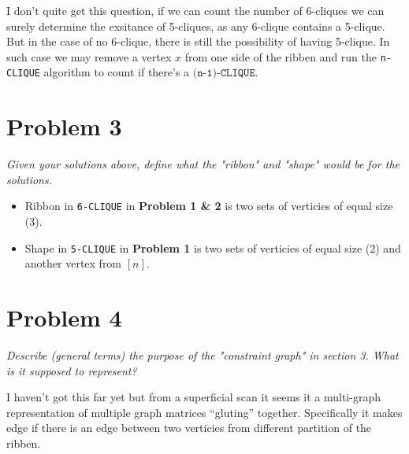 \documentclass[11pt]{article}
\newcommand{\ilc}{\texttt}
\begin{document}
\noindent I don't quite get this question, if we can count the number of 6-cliques we can surely determine the exsitance of 5-cliques, as any 6-clique contains a 5-clique. But in the case of no 6-clique, there is still the possibility of having 5-clique. In such case we may remove a vertex $x$ from one side of the ribben and run the \ilc{n-CLIQUE} algorithm to count if there's a $\ilc{(n-1)-CLIQUE}$.


\section*{Problem 3}
\textit{Given your solutions above, define what the "ribbon" and "shape" would be for the solutions.}\newline

\begin{itemize}
    \item Ribbon in \ilc{6-CLIQUE} in \textbf{Problem 1 & 2} is two sets of verticies of equal size (3).
    \item Shape in \ilc{5-CLIQUE} in \textbf{Problem 1} is two sets of verticies of equal size (2) and another vertex from $[n]$.
\end{itemize}


\section*{Problem 4}

\textit{Describe (general terms) the purpose of the "constraint graph" in section 3.  What is it supposed to represent?}\newline

\noindent I haven't got this far yet but from a superficial scan it seems it a multi-graph representation of multiple graph matrices ``gluting'' together. Specifically it makes edge if there is an edge between two verticies from different partition of the ribben.
\end{document}
